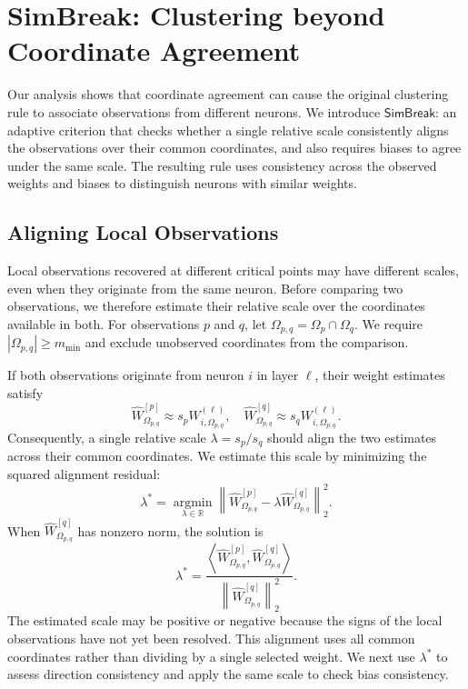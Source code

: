 \documentclass[runningheads]{llncs}
\newcommand{\ours}{{$\mathsf{SimBreak}$}\xspace}
\begin{document}
\section{\textbf{\textsf{SimBreak}}: Clustering beyond Coordinate Agreement}
\label{sec:method}
Our analysis shows that coordinate agreement can cause the original clustering rule to associate observations from different neurons.
We introduce \ours: an adaptive criterion that checks whether a single relative scale consistently aligns the observations over their common coordinates, and also requires biases to agree under the same scale.
The resulting rule uses consistency across the observed weights and biases to distinguish neurons with similar weights.

\subsection{Aligning Local Observations}
\label{sec:observation-alignment}

Local observations recovered at different critical points may have different scales, even when they originate from the same neuron.
Before comparing two observations, we therefore estimate their relative scale over the coordinates available in both.
For observations $p$ and $q$, let
$\Omega_{p,q}=\Omega_p\cap\Omega_q.$
We require $|\Omega_{p,q}|\geq m_{\min}$ and exclude unobserved coordinates from the comparison.

If both observations originate from neuron $i$ in layer $\ell$, their weight estimates satisfy
\begin{equation*}
\widehat W_{\Omega_{p,q}}^{[p]}\approx s_p W_{i,\Omega_{p,q}}^{(\ell)},\quad\widehat W_{\Omega_{p,q}}^{[q]}\approx s_q W_{i,\Omega_{p,q}}^{(\ell)}.
\end{equation*}
Consequently, a single relative scale $\lambda=s_p/s_q$ should align the two estimates across their common coordinates.
We estimate this scale by minimizing the squared alignment residual:
\begin{equation*}
\lambda^*=\underset{\lambda\in\mathbb R}{\operatorname{argmin}}\left\|\widehat W_{\Omega_{p,q}}^{[p]}-\lambda\widehat W_{\Omega_{p,q}}^{[q]}\right\|_2^2.
\end{equation*}
When $\widehat W_{\Omega_{p,q}}^{[q]}$ has nonzero norm, the solution is
\begin{equation*}
 \lambda^*
 =
 \frac{
 \left\langle
 \widehat W_{\Omega_{p,q}}^{[p]},
 \widehat W_{\Omega_{p,q}}^{[q]}
 \right\rangle
 }{
 \left\|\widehat W_{\Omega_{p,q}}^{[q]}\right\|_2^2
 }.
\end{equation*}
The estimated scale may be positive or negative because the signs of the local observations have not yet been resolved.
This alignment uses all common coordinates rather than dividing by a single selected weight.
We next use $\lambda^*$ to assess direction consistency and apply the same scale to check bias consistency.
\end{document}
